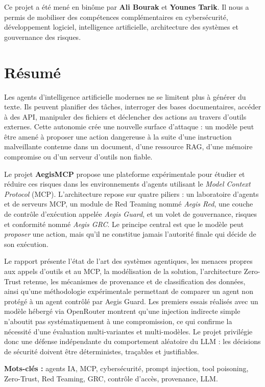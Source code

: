 \documentclass[12pt,a4paper,oneside]{report}
\newcommand{\Aegis}{\textbf{AegisMCP}}
\newcommand{\Guard}{\textit{Aegis Guard}}
\newcommand{\Red}{\textit{Aegis Red}}
\newcommand{\GRC}{\textit{Aegis GRC}}
\begin{document}
Ce projet a été mené en binôme par \textbf{Ali Bourak} et \textbf{Younes Tarik}. Il nous a permis de mobiliser des compétences complémentaires en cybersécurité, développement logiciel, intelligence artificielle, architecture des systèmes et gouvernance des risques.

\chapter*{Résumé}
Les agents d'intelligence artificielle modernes ne se limitent plus à générer du texte. Ils peuvent planifier des tâches, interroger des bases documentaires, accéder à des API, manipuler des fichiers et déclencher des actions au travers d'outils externes. Cette autonomie crée une nouvelle surface d'attaque : un modèle peut être amené à proposer une action dangereuse à la suite d'une instruction malveillante contenue dans un document, d'une ressource RAG, d'une mémoire compromise ou d'un serveur d'outils non fiable.

Le projet \Aegis{} propose une plateforme expérimentale pour étudier et réduire ces risques dans les environnements d'agents utilisant le \textit{Model Context Protocol} (MCP). L'architecture repose sur quatre piliers : un laboratoire d'agents et de serveurs MCP, un module de Red Teaming nommé \Red{}, une couche de contrôle d'exécution appelée \Guard{}, et un volet de gouvernance, risques et conformité nommé \GRC{}. Le principe central est que le modèle peut \emph{proposer} une action, mais qu'il ne constitue jamais l'autorité finale qui décide de son exécution.

Le rapport présente l'état de l'art des systèmes agentiques, les menaces propres aux appels d'outils et au MCP, la modélisation de la solution, l'architecture Zero-Trust retenue, les mécanismes de provenance et de classification des données, ainsi qu'une méthodologie expérimentale permettant de comparer un agent non protégé à un agent contrôlé par Aegis Guard. Les premiers essais réalisés avec un modèle hébergé via OpenRouter montrent qu'une injection indirecte simple n'aboutit pas systématiquement à une compromission, ce qui confirme la nécessité d'une évaluation multi-variantes et multi-modèles. Le projet privilégie donc une défense indépendante du comportement aléatoire du LLM : les décisions de sécurité doivent être déterministes, traçables et justifiables.

\textbf{Mots-clés :} agents IA, MCP, cybersécurité, prompt injection, tool poisoning, Zero-Trust, Red Teaming, GRC, contrôle d'accès, provenance, LLM.
\end{document}
